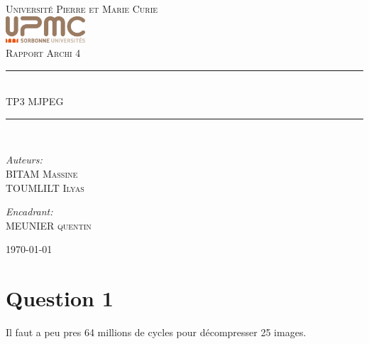 \documentclass[12pt]{article}
\newcommand{\HRule}{\rule{\linewidth}{0.5mm}}
\begin{document}
\begin{titlepage}
  \begin{center}
    \textsc{\LARGE Université Pierre et Marie Curie}\\[1.5cm]
    \includegraphics[height=1cm]{upmc.png}\\[1.5cm]
    \textsc{\Large Rapport Archi 4 }\\[2cm]
    \HRule \\[1cm]
    \textsc{\huge TP3 MJPEG }\\[0.5cm]
    \HRule \\[1cm]
    \noindent
    \begin{minipage}[t]{0.55\textwidth}
      \begin{flushleft} \large
        \emph{Auteurs:}\\
        BITAM \textsc{Massine}\\
        TOUMLILT \textsc{Ilyas}
      \end{flushleft}
    \end{minipage}%
    \begin{minipage}[t]{0.47\textwidth}
      \begin{flushright} \large
        \emph{Encadrant:} \\
        MEUNIER \textsc{quentin}
      \end{flushright}
    \end{minipage}
    \vfill
    {\large \today}
  \end{center}
\end{titlepage}
\section*{Question 1}
Il faut a peu pres 64 millions de cycles pour décompresser 25 images.
\end{document}
